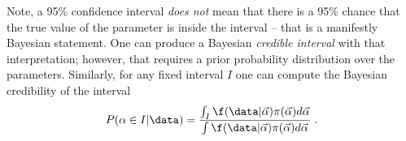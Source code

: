 Note, a 95\% confidence interval \textit{does not} mean that there is a 95\% chance that the true value of the parameter is inside the interval -- that is a manifestly Bayesian statement.  One can produce a Bayesian \textit{credible interval} with that interpretation; however, that requires a prior probability distribution over the parameters.  Similarly, for any fixed interval $I$ one can compute the Bayesian credibility of the interval 
\begin{equation}
\label{eq:credible}
P(\alpha\in I | \data) = \frac{ \int_{I}  \f(\data | \vec\alpha) \pi(\vec\alpha) d\vec\alpha }{\int \f(\data | \vec\alpha) \pi(\vec\alpha) d\vec\alpha} \;.
\end{equation}
